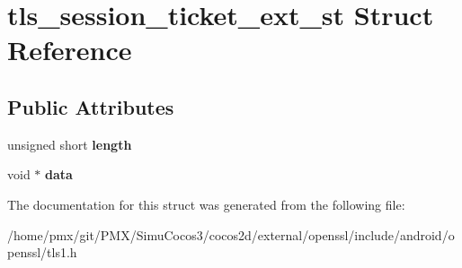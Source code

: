 \hypertarget{structtls__session__ticket__ext__st}{}\section{tls\+\_\+session\+\_\+ticket\+\_\+ext\+\_\+st Struct Reference}
\label{structtls__session__ticket__ext__st}
\subsection*{Public Attributes}
\begin{DoxyCompactItemize}
\item 
\mbox{\label{structtls__session__ticket__ext__st_ab4a3be707090c71d78abec6456b8a3a9}} 
unsigned short {\bfseries length}
\item 
\mbox{\label{structtls__session__ticket__ext__st_a7a18f427e837bdb547caaaeef429eedb}} 
void $\ast$ {\bfseries data}
\end{DoxyCompactItemize}


The documentation for this struct was generated from the following file\+:\begin{DoxyCompactItemize}
\item 
/home/pmx/git/\+P\+M\+X/\+Simu\+Cocos3/cocos2d/external/openssl/include/android/openssl/tls1.\+h\end{DoxyCompactItemize}

